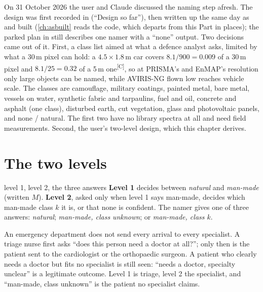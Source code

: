 \documentclass[11pt,a4paper,oneside,openany]{book}
\newcommand{\comp}{\textsuperscript{\textsf{\scriptsize[C]}}}
\begin{document}
On 31 October 2026 the user and Claude discussed the naming step afresh. The design was first recorded in 
(``Design so far''), then written up the same day as  and built (\cref{ch:asbuilt} reads the code, which departs from this
Part in places); the parked plan in  still describes one namer with a ``none'' output. Two decisions came out of it. First, a class list aimed at
what a defence analyst asks, limited by what a 30\,m pixel can hold: a $4.5\times1.8$\,m car covers $8.1/900=0.009$ of a 30\,m pixel and $8.1/25=0.32$ of a 5\,m one\comp,
so at PRISMA's and EnMAP's resolution only large objects can be named, while AVIRIS-NG flown low reaches vehicle scale. The classes are camouflage, military
coatings, painted metal, bare metal, vessels on water, synthetic fabric and tarpaulins, fuel and oil, concrete and asphalt (one class), disturbed earth, cut vegetation,
glass and photovoltaic panels, and none / natural. The first two have no library spectra at all and need field measurements. Second, the user's two-level design,
which this chapter derives.

\section{The two levels}

\begin{defn}{level 1, level 2, the three answers}
\textbf{Level 1} decides between \emph{natural} and \emph{man-made} (written $M$). \textbf{Level 2}, asked only when level 1 says man-made, decides
which man-made class $k$ it is, or that none is confident. The namer gives one of three answers: \emph{natural}; \emph{man-made, class unknown}; or \emph{man-made, class $k$}.
\end{defn}

\begin{analogy}
An emergency department does not send every arrival to every specialist. A triage nurse first asks ``does this person need a doctor at all?''; only then is the patient
sent to the cardiologist or the orthopaedic surgeon. A patient who clearly needs a doctor but fits no specialist is still seen: ``needs a doctor, specialty unclear'' is
a legitimate outcome. Level 1 is triage, level 2 the specialist, and ``man-made, class unknown'' is the patient no specialist claims.
\end{analogy}
\end{document}
